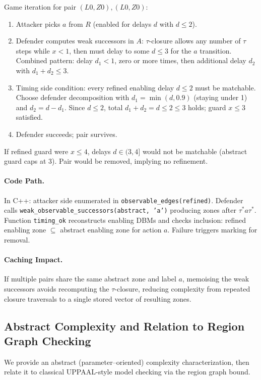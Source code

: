 Game iteration for pair $(L0,Z0),(L0,Z0)$:
\begin{enumerate}
  \item Attacker picks $a$ from $R$ (enabled for delays $d$ with $d\le 2$).
  \item Defender computes weak successors in $A$: $\tau$-closure allows any number of $\tau$ steps while $x<1$, then must delay to some $d \le 3$ for the $a$ transition. Combined pattern: delay $d_1 < 1$, zero or more times, then additional delay $d_2$ with $d_1 + d_2 \le 3$.
  \item Timing side condition: every refined enabling delay $d \le 2$ must be matchable. Choose defender decomposition with $d_1 = \min(d, 0.9)$ (staying under 1) and $d_2 = d - d_1$. Since $d \le 2$, total $d_1+d_2 = d \le 2 \le 3$ holds; guard $x\le 3$ satisfied.
  \item Defender succeeds; pair survives.
\end{enumerate}

If refined guard were $x \le 4$, delays $d\in (3,4]$ would not be matchable (abstract guard caps at 3). Pair would be removed, implying no refinement.

\paragraph{Code Path.} In C++: attacker side enumerated in \texttt{observable\_edges(refined)}. Defender calls \texttt{weak\_observable\_successors(abstract, 'a')} producing zones after $\tau^* a \tau^*$. Function \texttt{timing\_ok} reconstructs enabling DBMs and checks inclusion: refined enabling zone $\subseteq$ abstract enabling zone for action $a$. Failure triggers marking for removal.

\paragraph{Caching Impact.} If multiple pairs share the same abstract zone and label $a$, memoising the weak successors avoids recomputing the $\tau$-closure, reducing complexity from repeated closure traversals to a single stored vector of resulting zones.

\subsection{Abstract Complexity and Relation to Region Graph Checking}
We provide an abstract (parameter–oriented) complexity characterization, then relate it to classical UPPAAL-style model checking via the region graph bound.

